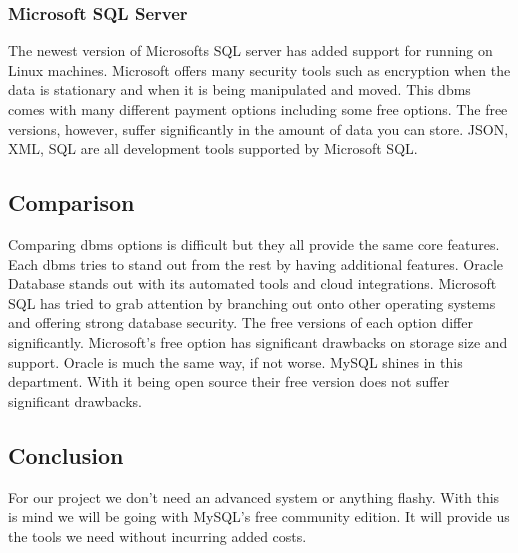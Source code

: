 \documentclass[onecolumn, draftclsnofoot,10pt, compsoc]{IEEEtran}
\begin{document}
		\subsubsection{Microsoft SQL Server}
			The newest version of Microsofts SQL server has added support for running on Linux machines.
			Microsoft offers many security tools such as encryption when the data is stationary and when it is being manipulated and moved\cite{microsoft_comparison}.
			This dbms comes with many different payment options including some free options.
			The free versions, however, suffer significantly in the amount of data you can store.
			JSON, XML, SQL are all development tools supported by Microsoft SQL\cite{microsoft_editions}.

	\subsection{Comparison}
		Comparing dbms options is difficult but they all provide the same core features.
		Each dbms tries to stand out from the rest by having additional features.
		Oracle Database stands out with its automated tools and cloud integrations.
		Microsoft SQL has tried to grab attention by branching out onto other operating systems and offering strong database security.
		The free versions of each option differ significantly.
		Microsoft's free option has significant drawbacks on storage size and support.
		Oracle is much the same way, if not worse.
		MySQL shines in this department.
		With it being open source their free version does not suffer significant drawbacks.

	\subsection{Conclusion}
		For our project we don't need an advanced system or anything flashy.
		With this is mind we will be going with MySQL's free community edition.
		It will provide us the tools we need without incurring added costs.



\end{document}
